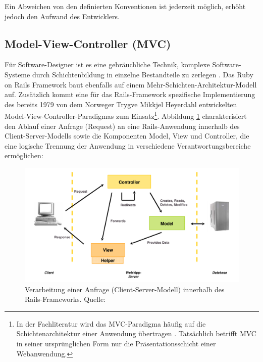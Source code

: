 Ein Abweichen von den definierten Konventionen ist jederzeit möglich, erhöht jedoch den Aufwand des Entwicklers.

\subsection{Model-View-Controller (MVC)}
\label{sec:mvc}
Für Software-Designer ist es  eine gebräuchliche Technik, komplexe Software-Systeme durch Schichtenbildung in einzelne Bestandteile zu zerlegen \citep[Kapitel 1]{FowlerPatterns}. Das Ruby on Rails Framework baut ebenfalls auf einem Mehr-Schichten-Architektur-Modell auf. Zusätzlich kommt eine für das Rails-Framework spezifische Implementierung des bereits 1979 von dem Norweger Trygve Mikkjel Heyerdahl entwickelten Model-View-Controller-Paradigmas zum Einsatz\footnote{In der Fachliteratur wird das MVC-Paradigma häufig auf die Schichtenarchitektur einer Anwendung übertragen \cite[S. 544 ff.]{objekt}. Tatsächlich betrifft MVC in seiner  ursprünglichen Form nur die Präsentationsschicht einer Webanwendung.}.
Abbildung \ref{fig:mvcimage} charakterisiert den Ablauf einer Anfrage (Request) an eine Rails-Anwendung innerhalb des Client-Server-Modells sowie die Komponenten Model, View und Controller, die eine logische Trennung der Anwendung in verschiedene Verantwortungsbereiche ermöglichen:

\begin{figure}[!h]
\begin{center}
\includegraphics[scale=0.4]{images/analyse/mvc.png}


\caption[Verarbeitung einer Anfrage innerhalb des Rails-Frameworks]{Verarbeitung einer Anfrage (Client-Server-Modell) innerhalb des Rails-Frameworks. Quelle: \citep[Seite 6]{railsmvc}}
\label{fig:mvcimage}
\end{center}
\end{figure}

